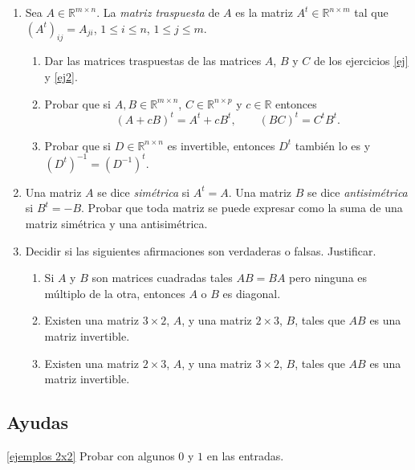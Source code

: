 \documentclass[12pt]{amsart}
\begin{document}
\begin{enumerate}[resume, topsep=5pt,itemsep=5pt]
\item Sea $A\in\mathbb{R}^{m\times n}$. La \emph{matriz traspuesta} de $A$ es la matriz $A^t\in\mathbb{R}^{n\times m}$ tal que
$(A^t)_{ij}=A_{ji}$, $1\le i\le n$, $1\le j\le m$.
\begin{enumerate}[topsep=5pt,itemsep=5pt]
 \item Dar las matrices traspuestas de las matrices $A$, $B$ y $C$ de los ejercicios \eqref{ej} y \eqref{ej2}.
 \item Probar que si $A,B\in\mathbb{R}^{m\times n}$, $C\in\mathbb{R}^{n\times p}$ y $c\in\mathbb{R}$ entonces
$$(A+cB)^t=A^{t} + c B^t, \quad\quad (BC)^t= C^t B^t.$$

\item Probar que si $D\in\mathbb{R}^{n\times n}$ es invertible, entonces $D^t$ tambi\'en lo es y $(D^{t})^{-1}=(D^{-1})^{t}$.
\end{enumerate}

\item Una matriz $A$ se dice {\it sim\'etrica} si $A^t=A$. Una matriz $B$ se dice {\it antisim\'etrica} si $B^t=-B$. Probar que toda matriz se puede expresar como la suma de una matriz sim\'etrica y una antisim\'etrica.

\item Decidir si las siguientes afirmaciones son verdaderas o falsas. Justificar.
\begin{enumerate}[topsep=5pt,itemsep=5pt]

\item Si $A$ y $B$ son matrices cuadradas tales $AB=BA$ pero ninguna es m\'ultiplo de la otra, entonces $A$ o $B$ es diagonal.

\item Existen una matriz $3\times 2$, $A$,  y una matriz $2\times 3$, $B$, tales que $AB$ es una matriz invertible.

\item Existen una matriz $2\times 3$, $A$,  y una matriz $3\times 2$, $B$, tales que $AB$ es una matriz invertible.

\end{enumerate}

\end{enumerate}



\subsection*{Ayudas}

\eqref{ejemplos 2x2} Probar con algunos $0$ y $1$ en las entradas.
\end{document}
